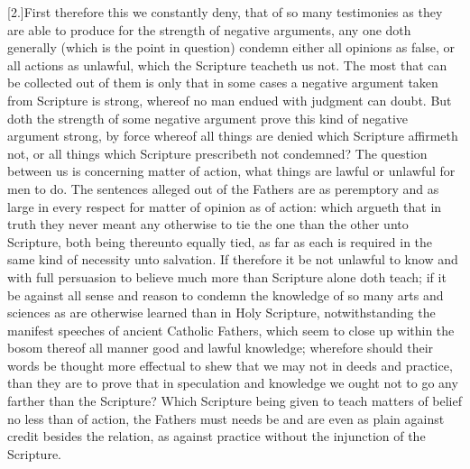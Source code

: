 [2.]First therefore this we constantly deny, that of so many testimonies as they are able to produce for the strength of negative arguments, any one doth generally (which is the point in question) condemn either all opinions as false, or all actions as unlawful, which the Scripture teacheth us not. The most that can be collected out of them is only that in some cases a negative argument taken from Scripture is strong, whereof no man endued with judgment can doubt. But doth the strength of some negative argument prove this kind of negative argument strong, by force whereof all things are denied which Scripture affirmeth not, or all things which Scripture prescribeth not condemned? The question between us is concerning matter of action, what things are lawful or unlawful for men to do. The sentences alleged out of the Fathers are as peremptory and as large in every respect for matter of opinion as of action: which argueth that in truth they never meant any otherwise to tie the one than the other unto Scripture, both being thereunto equally tied, as far as each is required in the same kind of necessity unto salvation. If therefore it be not unlawful to know and with full persuasion to believe much more than Scripture alone doth teach; if it be against all sense and reason to condemn the knowledge of so many arts and sciences as are otherwise learned than in Holy Scripture, notwithstanding the manifest speeches of ancient Catholic Fathers, which seem to close up within the bosom thereof all manner good and lawful knowledge; wherefore  should their words be thought more effectual to shew that we may not in deeds and practice, than they are to prove that in speculation and knowledge we ought not to go any farther than the Scripture? Which Scripture being given to teach matters of belief no less than of action, the Fathers must needs be and are even as plain against credit besides the relation, as against practice without the injunction of the Scripture.

